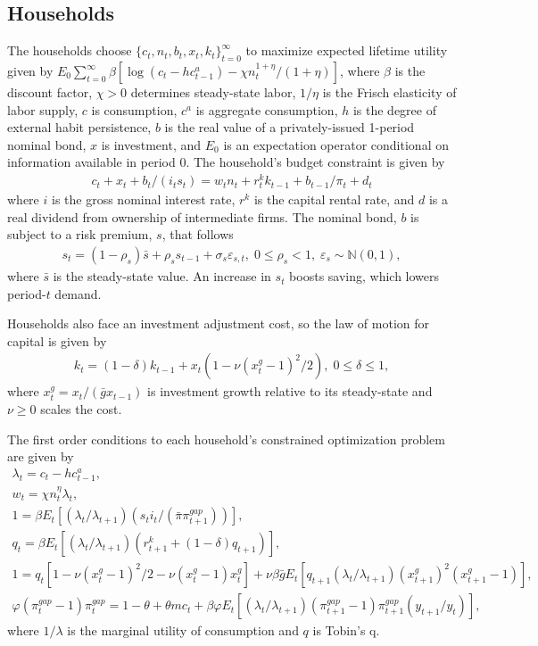 \documentclass[12pt, final]{article}
\begin{document}
\subsection{Households} The households choose $\{c_t, n_t, b_t, x_t, k_t\}_{t=0}^\infty$ to maximize expected lifetime utility given by $E_0\sum_{t=0}^\infty\beta[\log(c_t-hc^a_{t-1}) - \chi n_t^{1+\eta}/(1+\eta)]$, where $\beta$ is the discount factor, $\chi > 0$ determines steady-state labor, $1/\eta$ is the Frisch elasticity of labor supply, $c$ is consumption, $c^a$ is aggregate consumption, $h$ is the degree of external habit persistence, $b$ is the real value of a privately-issued 1-period nominal bond, $x$ is investment, and $E_0$ is an expectation operator conditional on information available in period 0. The household's budget constraint is given by
\begin{gather*}
    c_t+x_t+b_t/(i_ts_t)=w_tn_t+r_t^kk_{t-1}+b_{t-1}/\pi_t+d_t
  \end{gather*}
where $i$ is the gross nominal interest rate, $r^k$ is the capital rental rate, and $d$ is a real dividend from ownership of intermediate firms. The nominal bond, $b$ is subject to a risk premium, $s$, that follows
\begin{gather}
  \label{eq:6}
  s_t = (1-\rho_s)\bar{s} + \rho_ss_{t-1} + \sigma_s\varepsilon_{s,t},\; 0 \leq \rho_s < 1,\; \varepsilon_s \sim \mathds{N}(0,1),
\end{gather}
where $\bar{s}$ is the steady-state value. An increase in $s_t$ boosts saving, which lowers period-$t$ demand.

Households also face an investment adjustment cost, so the law of motion for capital is given by
\begin{gather}
  k_t = (1-\delta)k_{t-1} + x_t(1-\nu(x^g_t - 1)^2/2),\; 0 \leq \delta \leq 1,
  \end{gather}
where $x_t^g = x_t/(\bar{g}x_{t-1})$ is investment growth relative to its steady-state and $\nu \geq 0$ scales the cost.

The first order conditions to each household's constrained optimization problem are given by
\begin{gather}
  \lambda_t = c_t - hc^a_{t-1}, \\
  w_t = \chi n_t^\eta \lambda_t,\\
  1 =  \beta E_t[(\lambda_t/\lambda_{t+1})(s_ti_t/(\bar{\pi}\pi_{t+1}^{gap}))],\\
  q_t = \beta E_t[(\lambda_t/\lambda_{t+1})(r^k_{t+1}+(1-\delta)q_{t+1})],\\
  1 = q_t[1-\nu(x^g_t-1)^2/2 - \nu(x_t^g-1)x_t^g] + \nu\beta\bar{g}E_t[q_{t+1}(\lambda_t/\lambda_{t+1})(x^g_{t+1})^2(x^g_{t+1}-1)],\\
  \varphi(\pi_t^{gap}-1)\pi_t^{gap} = 1-\theta + \theta mc_t + \beta\varphi E_t[(\lambda_t/\lambda_{t+1})(\pi_{t+1}^{gap}-1)\pi_{t+1}^{gap}(y_{t+1}/y_t)],
\end{gather}
where $1/\lambda$ is the marginal utility of consumption and $q$ is Tobin's q.\\
\end{document}
